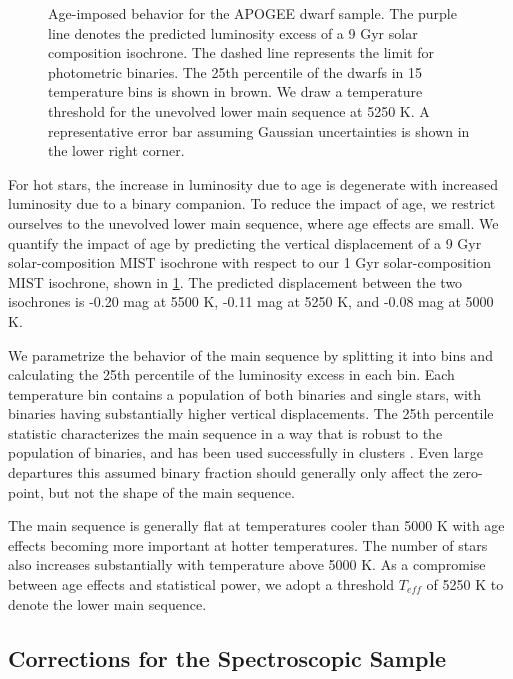 \documentclass[manuscript]{aastex6}
\newcommand{\Teff}{\ensuremath{T_{eff}}}
\begin{document}
\begin{figure}[htb]
    \centering
    \caption{Age-imposed behavior for the APOGEE dwarf sample. The purple
        line denotes the predicted luminosity excess of a 9 Gyr solar
        composition isochrone. The dashed line represents the limit for 
        photometric binaries. The 25th percentile of the dwarfs in 15 
        temperature bins is shown in brown. We draw a temperature threshold 
        for the unevolved lower main sequence at 5250 K. A representative 
        error bar assuming Gaussian uncertainties is shown in the lower right
    corner.}
    \label{fig:ages}
\end{figure}

For hot stars, the increase in luminosity due to age is degenerate with
increased luminosity due to a binary companion. To reduce the impact of age,
we restrict ourselves to the unevolved lower main sequence, where age
effects are small. We quantify the impact of age by predicting the vertical
displacement of a 9 Gyr solar-composition MIST isochrone with respect to our 
1 Gyr solar-composition MIST isochrone, shown in \cref{fig:ages}. The
predicted displacement between the two isochrones is -0.20 mag at 5500 K, 
-0.11 mag at 5250 K, and -0.08 mag at 5000 K.

We parametrize the behavior of the main sequence by splitting it into bins
and calculating the 25th percentile of the luminosity excess in each bin. Each 
temperature bin contains a population of both binaries and single stars, with 
binaries having substantially higher vertical displacements. The 25th 
percentile statistic characterizes the main sequence in a way that is robust 
to the population of binaries, and has been used successfully in clusters 
\citep{An06}. Even large departures this assumed binary fraction should 
generally only affect the zero-point, but not the shape of the main sequence.

The main sequence is generally flat at temperatures cooler than 5000 K with
age effects becoming more important at hotter temperatures. The number of stars
also increases substantially with temperature above 5000 K. As a compromise
between age effects and statistical power, we adopt a threshold \Teff{} of 
5250 K to denote the lower main sequence.

\subsection{Corrections for the Spectroscopic Sample}
\end{document}
